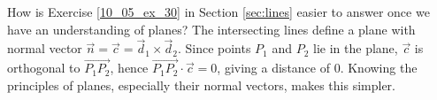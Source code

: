 {How is Exercise \ref{10_05_ex_30} in Section \ref{sec:lines} easier to answer once we have an understanding of planes?
}
{The intersecting lines define a plane with normal vector $\vec n = \vec c = \vec d_1\times \vec d_2$. Since points $P_1$ and $P_2$ lie in the plane, $\vec c$ is orthogonal to $\overrightarrow{P_1P_2}$, hence $\overrightarrow{P_1P_2}\cdot\vec c = 0$, giving a distance of 0. Knowing the principles of planes, especially their normal vectors, makes this simpler.
}